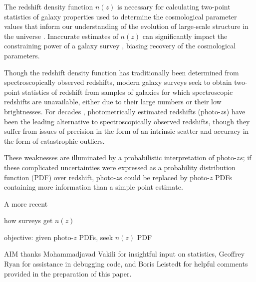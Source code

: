 \documentclass[preprint]{aastex}
\begin{document}
The redshift density function $n(z)$ is necessary for calculating two-point statistics of galaxy properties used to determine the cosmological parameter values that inform our understanding of the evolution of large-scale structure in the universe \citep{masters_mapping_2015}.  Inaccurate estimates of $n(z)$ can significantly impact the constraining power of a galaxy survey \citep{hildebrandt_kids-450:_2016}, biasing recovery of the cosmological parameters.  

Though the redshift density function has traditionally been determined from spectroscopically observed redshifts, modern galaxy surveys seek to obtain two-point statistics of redshift from samples of galaxies for which spectroscopic redshifts are unavailable, either due to their large numbers or their low brightnesses.  For decades \citep{baum_photoelectric_1962}, photometrically estimated redshifts (photo-$z$s) have been the leading alternative to spectroscopically observed redshifts, though they suffer from issues of precision in the form of an intrinsic scatter and accuracy in the form of catastrophic outliers.  

These weaknesses are illuminated by a probabilistic interpretation of photo-$zs$; if these complicated uncertainties were expressed as a probability distribution function (PDF) over redshift, photo-$z$s could be replaced by photo-$z$ PDFs containing more information than a simple point estimate.

A more recent 

how surveys get $n(z)$

objective: given photo-$z$ PDFs, seek $n(z)$ PDF


\begin{acknowledgements}
AIM thanks Mohammadjavad Vakili for insightful input on statistics, Geoffrey Ryan for assistance in debugging code, and Boris Leistedt for helpful comments provided in the preparation of this paper.
\end{acknowledgements}



\end{document}
